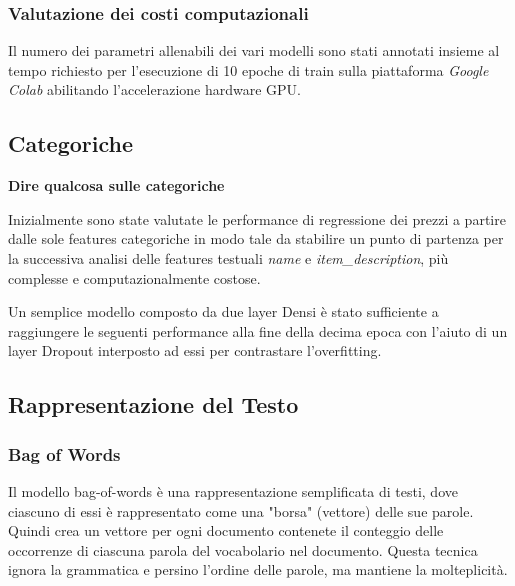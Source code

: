 
\subsubsection{Valutazione dei costi computazionali}

Il numero dei parametri allenabili dei vari modelli sono stati annotati insieme
al tempo richiesto per l'esecuzione di 10 epoche di train sulla piattaforma
\textit{Google Colab} abilitando l'accelerazione hardware GPU.

\subsection{Categoriche}
\textbf{Dire qualcosa sulle categoriche}

Inizialmente sono state valutate le performance di regressione dei prezzi a
partire dalle sole features categoriche in modo tale da stabilire un punto di
partenza per la successiva analisi delle features testuali \textit{name} e
\textit{item\_description}, più complesse e computazionalmente costose.

Un semplice modello composto da due layer Densi è stato sufficiente a
raggiungere le seguenti performance alla fine della decima epoca con l'aiuto di
un layer Dropout interposto ad essi per contrastare l'overfitting.



\subsection{Rappresentazione del Testo}

\subsubsection{Bag of Words}
Il modello bag-of-words è una rappresentazione semplificata  di testi, dove ciascuno di essi è rappresentato come una "borsa" (vettore) delle sue parole. Quindi crea un vettore per ogni documento contenete il conteggio delle occorrenze di ciascuna parola del vocabolario nel documento. Questa tecnica ignora la grammatica e persino l'ordine delle parole, ma mantiene la molteplicità.
